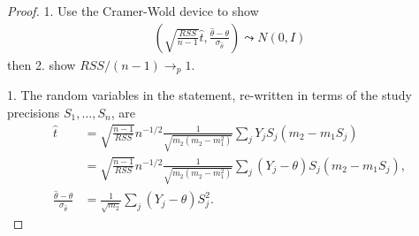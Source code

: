 \documentclass[12pt]{article}
\newcommand{\m}{m}
\newcommand{\s}{S}
\newcommand{\y}{Y}
\renewcommand{\t}{t}
\begin{document}
\begin{proof}
  1. Use the Cramer-Wold device to show
  \begin{align}
    \left(\sqrt{\frac{RSS}{n-1}}\hat\t,\frac{\hat\theta-\theta}{\sigma_{\hat\theta}}\right) \leadsto N(0,I)
    \label{pf:egger asy:cramer}
  \end{align}
  then 2. show $RSS/(n-1)\to_p 1$.

  1. The random variables in the statement, re-written in terms of the study precisions $\s_1,\ldots,\s_n$, are
  \begin{align}
    \hat\t&=\sqrt{\frac{n-1}{RSS}}n^{-1/2}\frac{1}{\sqrt{\m_2(\m_2-\m_1^2)}}\sum_j\y_j\s_j(\m_2-\m_1\s_j)\\
          &=\sqrt{\frac{n-1}{RSS}}n^{-1/2}\frac{1}{\sqrt{\m_2(\m_2-\m_1^2)}}\sum_j(\y_j-\theta)\s_j(\m_2-\m_1\s_j),\\
    \frac{\hat\theta-\theta}{\sigma_{\hat\theta}} &=
                                                    \frac{1}{\sqrt{m_2}}\sum_j(\y_j-\theta)\s_j^2.
  \end{align}


\end{proof}
\end{document}
